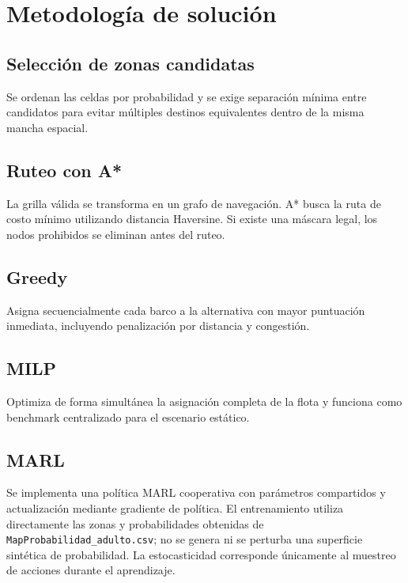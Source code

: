 \section{Metodología de solución}
\subsection{Selección de zonas candidatas}
Se ordenan las celdas por probabilidad y se exige separación mínima entre candidatos para evitar múltiples destinos equivalentes dentro de la misma mancha espacial.
\subsection{Ruteo con A*}
La grilla válida se transforma en un grafo de navegación. A* busca la ruta de costo mínimo utilizando distancia Haversine. Si existe una máscara legal, los nodos prohibidos se eliminan antes del ruteo.
\subsection{Greedy}
Asigna secuencialmente cada barco a la alternativa con mayor puntuación inmediata, incluyendo penalización por distancia y congestión.
\subsection{MILP}
Optimiza de forma simultánea la asignación completa de la flota y funciona como benchmark centralizado para el escenario estático.
\subsection{MARL}
Se implementa una política MARL cooperativa con parámetros compartidos y actualización mediante gradiente de política. El entrenamiento utiliza directamente las zonas y probabilidades obtenidas de \texttt{MapProbabilidad\_adulto.csv}; no se genera ni se perturba una superficie sintética de probabilidad. La estocasticidad corresponde únicamente al muestreo de acciones durante el aprendizaje.
